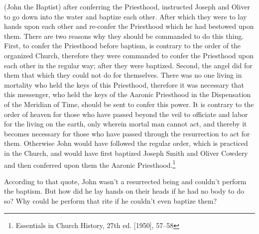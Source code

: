 \begin{displayquote}
(John the Baptist) after conferring the Priesthood, instructed Joseph and Oliver to 
go down into the water and baptize each other. After which they were to lay hands 
upon each other and re-confer the Priesthood which he had bestowed upon them. There 
are two reasons why they should be commanded to do this thing. First, to confer the 
Priesthood before baptism, is contrary to the order of the organized Church, 
therefore they were commanded to confer the Priesthood upon each other in the regular 
way; after they were baptized. Second, the angel did for them that which they could 
not do for themselves. There was no one living in mortality who held the keys of this 
Priesthood, therefore it was necessary that this messenger, who held the keys of the 
Aaronic Priesthood in the Dispensation of the Meridian of Time, should be sent to 
confer this power. It is contrary to the order of heaven for those who have passed 
beyond the veil to officiate and labor for the living on the earth, only wherein 
mortal man cannot act, and thereby it becomes necessary for those who have passed 
through the resurrection to act for them. Otherwise John would have followed the 
regular order, which is practiced in the Church, and would have first baptized 
Joseph Smith and Oliver Cowdery and then conferred upon them the Aaronic 
Priesthood.\footnote{Essentials in Church History, 27th ed. [1950], 57–58}
\end{displayquote}

According to that quote, John wasn't a resurrected being and couldn't perform the
baptism. But how did he lay hands on their heads if he had no body to do so? Why
could he perform that rite if he couldn't even baptize them?